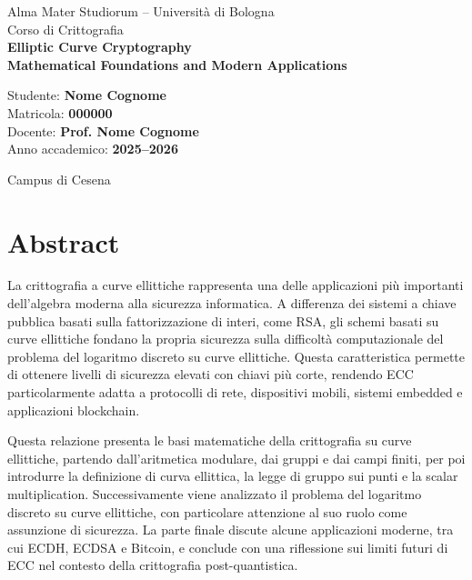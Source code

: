 \documentclass[12pt,a4paper,oneside]{report}
\begin{document}
\begin{titlepage}
    \centering
    {\Large Alma Mater Studiorum -- Università di Bologna\\}
    \vspace{0.4cm}
    {\large Corso di Crittografia\\}
    \vspace{2.5cm}
    {\Huge \textbf{Elliptic Curve Cryptography}\\}
    \vspace{0.4cm}
    {\Large \textbf{Mathematical Foundations and Modern Applications}\\}
    \vspace{2.5cm}
    \begin{flushleft}
        \large
        Studente: \textbf{Nome Cognome}\\
        Matricola: \textbf{000000}\\
        Docente: \textbf{Prof. Nome Cognome}\\
        Anno accademico: \textbf{2025--2026}
    \end{flushleft}
    \vfill
    {\large Campus di Cesena\\}
\end{titlepage}


\chapter*{Abstract}

La crittografia a curve ellittiche rappresenta una delle applicazioni più importanti dell'algebra moderna alla sicurezza informatica. A differenza dei sistemi a chiave pubblica basati sulla fattorizzazione di interi, come RSA, gli schemi basati su curve ellittiche fondano la propria sicurezza sulla difficoltà computazionale del problema del logaritmo discreto su curve ellittiche. Questa caratteristica permette di ottenere livelli di sicurezza elevati con chiavi più corte, rendendo ECC particolarmente adatta a protocolli di rete, dispositivi mobili, sistemi embedded e applicazioni blockchain.

Questa relazione presenta le basi matematiche della crittografia su curve ellittiche, partendo dall'aritmetica modulare, dai gruppi e dai campi finiti, per poi introdurre la definizione di curva ellittica, la legge di gruppo sui punti e la scalar multiplication. Successivamente viene analizzato il problema del logaritmo discreto su curve ellittiche, con particolare attenzione al suo ruolo come assunzione di sicurezza. La parte finale discute alcune applicazioni moderne, tra cui ECDH, ECDSA e Bitcoin, e conclude con una riflessione sui limiti futuri di ECC nel contesto della crittografia post-quantistica.
\end{document}
